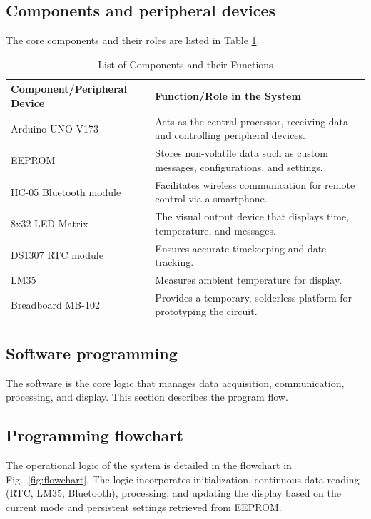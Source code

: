 \documentclass[a4paper, 10pt]{article}
\begin{document}
	\subsection{Components and peripheral devices}
	The core components and their roles are listed in Table \ref{tab:components}.
	\begin{table}[htbp]
		\centering
		\caption{List of Components and their Functions}
		\begin{tabularx}{\textwidth}{@{}lX@{}}
			\toprule
			\textbf{Component/Peripheral Device} & \textbf{Function/Role in the System} \\
			\midrule
			Arduino UNO V173 & Acts as the central processor, receiving data and controlling peripheral devices. \\
			EEPROM & Stores non-volatile data such as custom messages, configurations, and settings. \\
			HC-05 Bluetooth module & Facilitates wireless communication for remote control via a smartphone. \\
			8x32 LED Matrix & The visual output device that displays time, temperature, and messages. \\
			DS1307 RTC module & Ensures accurate timekeeping and date tracking. \\
			LM35 & Measures ambient temperature for display. \\
			Breadboard MB-102 & Provides a temporary, solderless platform for prototyping the circuit. \\
			\bottomrule
		\end{tabularx}
		\label{tab:components}
	\end{table}
	
	\subsection{Software programming}
	The software is the core logic that manages data acquisition, communication, processing, and display. This section describes the program flow.
	
	\subsection{Programming flowchart}
	The operational logic of the system is detailed in the flowchart in Fig.~\ref{fig:flowchart}. The logic incorporates initialization, continuous data reading (RTC, LM35, Bluetooth), processing, and updating the display based on the current mode and persistent settings retrieved from EEPROM.
	
\end{document}
